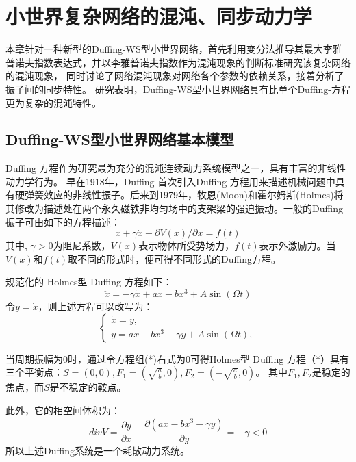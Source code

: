 \chapter{小世界复杂网络的混沌、同步动力学}
本章针对一种新型的Duffing-WS型小世界网络，首先利用变分法推导其最大李雅普诺夫指数表达式，并以李雅普诺夫指数作为混沌现象的判断标准研究该复杂网络的混沌现象，
同时讨论了网络混沌现象对网络各个参数的依赖关系，接着分析了振子间的同步特性。
研究表明，Duffing-WS型小世界网络具有比单个Duffing-方程更为复杂的混沌特性。
\section{Duffing-WS型小世界网络基本模型}

Duffing 方程作为研究最为充分的混沌连续动力系统模型之一，具有丰富的非线性动力学行为。
早在1918年，Duffing 首次引入Duffing 方程用来描述机械问题中具有硬弹簧效应的非线性振子。后来到1979年，牧恩(Moon)和霍尔姆斯(Holmes)将其修改为描述处在两个永久磁铁非均匀场中的支架梁的强迫振动。一般的Duffing 振子可由如下的方程描述：
\begin{equation}
    \ddot{x}+\gamma \dot{x}+\partial V(x)/\partial x = f(t)
\end{equation}
其中, $\gamma>0$为阻尼系数，$V(x)$表示物体所受势场力，$f(t)$表示外激励力。当$V(x)$和$f(t)$取不同的形式时，便可得不同形式的Duffing方程。

规范化的 Holmes型 Duffing 方程如下：
\begin{equation}
    \ddot{x}=-\gamma \dot{x}+a x-b x^{3}+A \sin (\Omega t)
\end{equation}
令$y=\dot{x}$，则上述方程可以改写为：
\begin{equation}
\left\{
  \begin{array}{ll}
    \dot{x}=y, \\
    \dot{y}=a x-b x^{3}-\gamma y+A \sin (\Omega t),
  \end{array}
\right.
\end{equation}

当周期振幅为0时，通过令方程组(*)右式为0可得Holmes型 Duffing 方程（*）具有三个平衡点：$S=(0,0),F_1=\left(\sqrt{\frac{a}{b}},0\right),F_2=\left(-\sqrt{\frac{a}{b}},0\right)$。
其中$F_1,F_2$是稳定的焦点，而$S$是不稳定的鞍点。

此外，它的相空间体积为：
\begin{equation}
div V = \frac{\partial y}{\partial x}+\frac{\partial(a x-b x^{3}-\gamma y)}{\partial y} = -\gamma <0
\end{equation}
所以上述Duffing系统是一个耗散动力系统。

